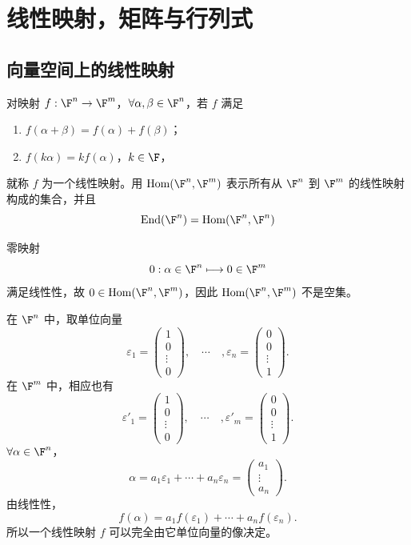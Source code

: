 \setchapterintro{}
\chapter{线性映射，矩阵与行列式}
\section{向量空间上的线性映射}

\begin{definition}
	对映射 $f:\F^n\to\F^m$，$\forall\alpha,\beta\in\F^n$，若 $f$ 满足
	\begin{enumerate}
		\item $f(\alpha+\beta)=f(\alpha)+f(\beta)$；
		\item $f(k\alpha)=k f(\alpha)$，$k\in\F$，
	\end{enumerate}
	就称 $f$ 为一个线性映射。用 $\operatorname{Hom}(\F^n,\F^m)$ 表示所有从 $\F^n$ 到 $\F^m$ 的线性映射构成的集合，并且
	\[
	\operatorname{End}(\F^n)=\operatorname{Hom}(\F^n,\F^n)
	\]
	
	零映射
	\[
	0:\alpha\in\F^n\longmapsto 0\in\F^m
	\]
	满足线性性，故 $0\in\operatorname{Hom}(\F^n,\F^m)$，因此 $\operatorname{Hom}(\F^n,\F^m)$ 不是空集。
	

\end{definition}
	在 $\F^n$ 中，取单位向量
\[
\varepsilon_1=\begin{pmatrix}1\\0\\\vdots\\0\end{pmatrix},
\quad \cdots \quad,
\varepsilon_n=\begin{pmatrix}0\\0\\\vdots\\1\end{pmatrix}.
\]
在 $\F^m$ 中，相应也有
\[
\varepsilon'_1=\begin{pmatrix}1\\0\\\vdots\\0\end{pmatrix},
\quad \cdots \quad,
\varepsilon'_m=\begin{pmatrix}0\\0\\\vdots\\1\end{pmatrix}.
\]
$\forall\alpha\in\F^n$，
\[
\alpha=a_1\varepsilon_1+\cdots+a_n\varepsilon_n
=\begin{pmatrix}a_1\\\vdots\\a_n\end{pmatrix}.
\]
由线性性，
\[
f(\alpha)=a_1f(\varepsilon_1)+\cdots+a_nf(\varepsilon_n).
\]
所以一个线性映射 $f$ 可以完全由它单位向量的像决定。

